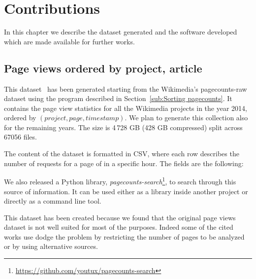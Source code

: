 \cleardoublepage{}
\chapter{Contributions}
\label{cha:Contributions}
In this chapter we describe the dataset generated and the software developed which are made available for further works.

\section{Page views ordered by project, article}
\label{sec:contrib_datasets_pagecounts}
This dataset~\cite{Bogon2016} has been generated starting from the Wikimedia's pagecounts-raw dataset using the program described in Section~\ref{sub:Sorting pagecounts}.
It contains the page view statistics for all the Wikimedia projects in the year 2014, ordered by $(project, page, timestamp)$.
We plan to generate this collection also for the remaining years.
The size is 4\,728 GB (428 GB compressed) split across 67056 files.

The content of the dataset is formatted in CSV, where each row describes the number of requests for a page of in a specific hour.
The fields are the following:

We also released a Python library, \emph{pagecounts-search}\footnote{\url{https://github.com/youtux/pagecounts-search}}, to search through this source of information.
It can be used either as a library inside another project or directly as a command line tool.

This dataset has been created because we found that the original page views dataset is not well suited for most of the purposes.
Indeed some of the cited works use dodge the problem by restricting the number of pages to be analyzed or by using alternative sources.

